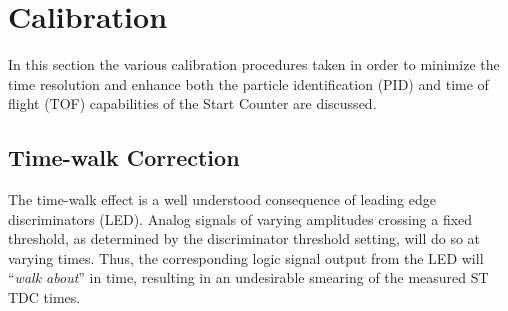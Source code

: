 \section{Calibration} \label{sec:calib}

In this section the various calibration procedures taken in order to minimize the time resolution and enhance both the particle identification (PID) and time of flight (TOF) capabilities of the Start Counter are discussed.

\subsection{Time-walk Correction} \label{sec:calib_tw}

The time-walk effect is a well understood consequence of leading edge discriminators (LED).  Analog signals of varying amplitudes crossing a fixed threshold, as determined by the discriminator threshold setting, will do so at varying times. %
Thus, the corresponding logic signal output from the LED will ``\textit{walk about}'' in time, resulting in an undesirable smearing of the measured ST TDC times.

